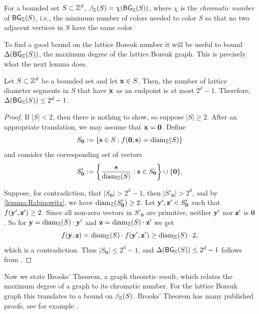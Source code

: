 \begin{remark}\label{Remark:equivalence}
    For a bounded set $S \subset \mathbb{Z}^d$,  $\beta_{\mathbb{Z}}(S)=\chi(\operatorname{\mathsf{BG}}_{\mathbb{Z}}(S))$, where $\chi$ is the \textit{chromatic number} of $\operatorname{\mathsf{BG}}_{\mathbb{Z}}(S)$, i.e., the minimum number of colors needed to color $S$ so that no two adjacent vertices in $S$ have the same color.
\end{remark}

To find a good bound on the lattice Borsuk number it will be useful to bound $\Delta(\operatorname{\mathsf{BG}}_{\mathbb{Z}}(S))$, the maximum degree of the lattice Borsuk graph. This is precisely what the next lemma does.

\begin{lemma}\label{Lemma:MaxDegree}
    Let $S \subset \mathbb{Z}^d$ be a bounded set and let $\mathbf{x} \in S$. Then, the number of lattice diameter segments in $S$ that have $\mathbf{x}$ as an endpoint is at most $2^d - 1$. Therefore, $\Delta(\operatorname{\mathsf{BG}}_{\mathbb{Z}}(S)) \leq 2^d-1$.
\end{lemma}

\begin{proof}
If $|S| <2$, then there is nothing to show, so suppose $|S|\geq 2$.  After an appropriate translation, we may assume that $\mathbf{x} = \mathbf{0}$. Define
\[
S_{\mathbf{0}} := \{ \mathbf{s} \in S : f(\mathbf{0}, \mathbf{s}) = \operatorname{diam}_{\mathbb{Z}}(S) \}
\]
and consider the corresponding set of vectors
\[
S'_{\mathbf{0}} := \left\{ \frac{\mathbf{s}}{\operatorname{diam}_{\mathbb{Z}}(S)} : \mathbf{s} \in S_{\mathbf{0}} \right\}\cup \{\mathbf{0}\}.
\]

Suppose, for contradiction, that $|S_{\mathbf{0}}| > 2^d-1$, then $|S'_{\mathbf{0}}| > 2^d$, and by \ref{lemma:Rabinowitz}, we have $\operatorname{diam}_{\mathbb{Z}}(S'_{\mathbf{0}}) \geq 2$. Let $\mathbf{y}', \mathbf{z}' \in S'_{\mathbf{0}}$ such that $f(\mathbf{y}', \mathbf{z}') \geq 2$. Since all non-zero vectors in $S'_{\mathbf{0}}$ are primitive, neither $\mathbf{y}'$ nor $\mathbf{z}'$ is $\mathbf{0}$. So for $\mathbf{y}=\operatorname{diam_{\mathbb{Z}}}(S)\cdot\mathbf{y}'$ and $\mathbf{z}=\operatorname{diam_{\mathbb{Z}}}(S)\cdot \mathbf{z}'$ we get
\[
f(\mathbf{y}, \mathbf{z}) = \operatorname{diam_{\mathbb{Z}}}(S) \cdot f(\mathbf{y}', \mathbf{z}') \geq \operatorname{diam_{\mathbb{Z}}}(S) \cdot 2,
\]
which is a contradiction. Thus $|S_\mathbf{0}| \leq 2^d-1$, and $\Delta(\operatorname{\mathsf{BG}}_{\mathbb{Z}}(S)) \leq 2^d-1$ follows from .
\end{proof}

Now we state Brooks' Theorem, a graph theoretic result, which relates the maximum degree of a graph to its chromatic number. For the lattice Borsuk graph this translates to a bound on $\beta_{\mathbb{Z}}(S)$. Brooks' Theorem has many published proofs, see for example \cite[Theorem~8.4]{bondy2008graph}.

